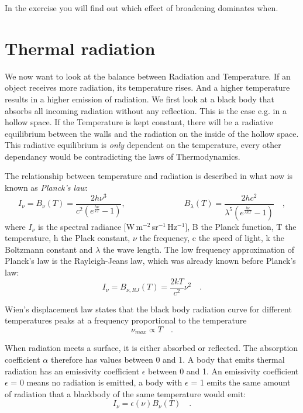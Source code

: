 In the exercise you will find out which effect of broadening dominates when. 


\section{Thermal radiation}

We now want to look at the balance between Radiation and
Temperature. If an object receives more radiation, its temperature
rises. And a higher temperature results in a higher emission of
radiation. We first look at a black body that absorbs all incoming
radiation without any reflection. This is the case e.g. in a hollow
space. If the Temperature is kept constant, there will be a radiative
equilibrium between the walls and the radiation on the inside of the
hollow space. This radiative equilibrium is \textit{only} dependent on
the temperature, every other dependancy would be contradicting the
laws of Thermodynamics.

The relationship between temperature and radiation is described in
what now is known as \textit{Planck's law}:
\begin{equation}
I_{\nu} = B_{\nu}(T) = \frac{2h\nu^3}{c^2(e^{\frac{h\nu}{kT}}-1)}, 
               \hspace{3cm} B_{\lambda}(T) = \frac{2hc^2}{\lambda^5(e^{\frac{hc}{\lambda kT}}-1)} \quad ,
\end{equation}
where $I_\nu$ is the spectral radiance
[W\,m$^{-2}$\,sr$^{-1}$\,Hz$^{-1}$], B the Planck function, T the
temperature, h the Plack constant, $\nu$ the frequency, c the speed of
light, k the Boltzmann constant and $\lambda$ the wave length.
The low frequency approximation of Planck's law is the
Rayleigh-Jeans law, which was already known before Planck's law:
\begin{equation}
I_{\nu} = B_{\nu, RJ}(T) = \frac{2kT}{c^2}\nu^2  \quad .
\end{equation}

Wien's displacement law states that the black body radiation curve for different temperatures peaks at a frequency proportional to the temperature
\begin{equation}
\nu_{max} \propto T  \quad .
\end{equation}

When radiation meets a surface, it is either absorbed or
reflected. The absorption coefficient $\alpha$ therefore has values
between 0 and 1. A body that emits thermal radiation has an emissivity
coefficient $\epsilon$ between 0 and 1. An emissivity coefficient
$\epsilon$ = 0 means no radiation is emitted, a body with $\epsilon$ =
1 emits the same amount of radiation that a blackbody of the same
temperature would emit:
\begin{equation}
I_\nu = \epsilon(\nu)B_\nu(T)  \quad .
\end{equation}

